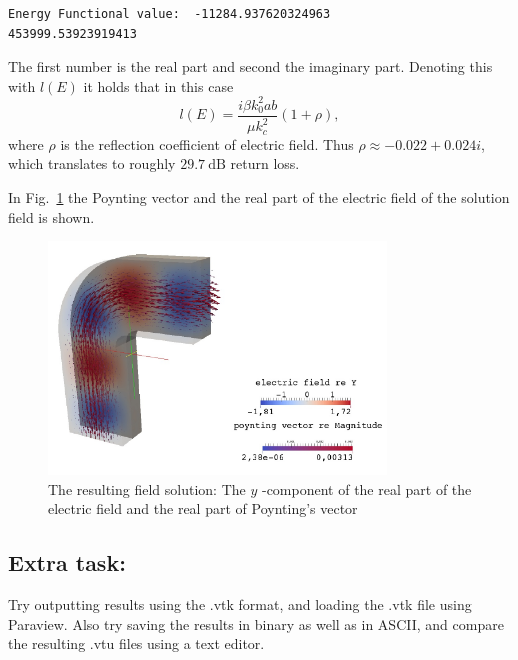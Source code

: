 \small{
\begin{verbatim}
Energy Functional value:  -11284.937620324963        453999.53923919413
\end{verbatim}
}

The first number is the real part and second the imaginary part. Denoting this with $l(E)$ it holds that in this case \[l(E) = \frac {i \beta k_0^2 ab}{\mu k_c^2} (1+\rho),\] where $\rho$ is the reflection coefficient of electric field. Thus $\rho\approx-0.022+0.024i$, which translates to roughly $29.7~\mathrm{dB}$ return loss.

In Fig.~\ref{fig:solution} the Poynting vector and the real part of the electric field of the solution field is shown.

\begin{figure}[htbp]
\centering
\includegraphics[width=0.8\textwidth]{result.pdf}
\caption{The resulting field solution: The $y$ -component of the real part of the electric field and the real part of Poynting's vector}
\label{fig:solution}
\end{figure}

\subsection*{Extra task:}

Try outputting results using the .vtk format, and loading the .vtk file using Paraview.  Also try saving the results in binary as well as in ASCII, and compare the resulting .vtu files using a text editor.

